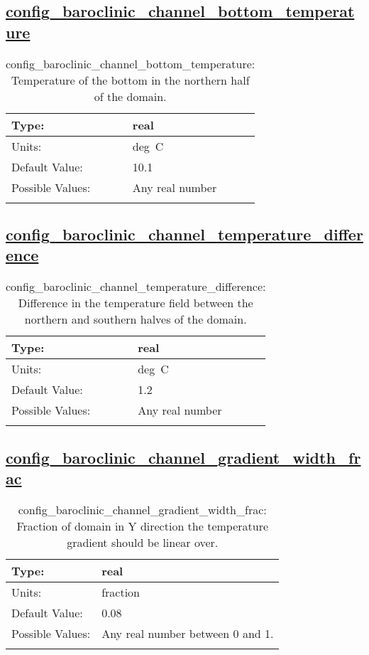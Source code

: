 \subsection[config\_baroclinic\_channel\_bottom\_temperature]{\hyperref[sec:nm_tab_baroclinic_channel]{config\_baroclinic\_channel\_bottom\_temperature}}
\label{subsec:nm_sec_config_baroclinic_channel_bottom_temperature}
\begin{center}
\begin{longtable}{| p{2.0in} || p{4.0in} |}
    \hline
    Type: & real \\
    \hline
    Units: & \si{deg.C} \\
    \hline
    Default Value: & 10.1 \\
    \hline
    Possible Values: & Any real number \\
    \hline
    \caption{config\_baroclinic\_channel\_bottom\_temperature: Temperature of the bottom in the northern half of the domain.}
\end{longtable}
\end{center}
\subsection[config\_baroclinic\_channel\_temperature\_difference]{\hyperref[sec:nm_tab_baroclinic_channel]{config\_baroclinic\_channel\_temperature\_difference}}
\label{subsec:nm_sec_config_baroclinic_channel_temperature_difference}
\begin{center}
\begin{longtable}{| p{2.0in} || p{4.0in} |}
    \hline
    Type: & real \\
    \hline
    Units: & \si{deg.C} \\
    \hline
    Default Value: & 1.2 \\
    \hline
    Possible Values: & Any real number \\
    \hline
    \caption{config\_baroclinic\_channel\_temperature\_difference: Difference in the temperature field between the northern and southern halves of the domain.}
\end{longtable}
\end{center}
\subsection[config\_baroclinic\_channel\_gradient\_width\_frac]{\hyperref[sec:nm_tab_baroclinic_channel]{config\_baroclinic\_channel\_gradient\_width\_frac}}
\label{subsec:nm_sec_config_baroclinic_channel_gradient_width_frac}
\begin{center}
\begin{longtable}{| p{2.0in} || p{4.0in} |}
    \hline
    Type: & real \\
    \hline
    Units: & \si{fraction} \\
    \hline
    Default Value: & 0.08 \\
    \hline
    Possible Values: & Any real number between 0 and 1. \\
    \hline
    \caption{config\_baroclinic\_channel\_gradient\_width\_frac: Fraction of domain in Y direction the temperature gradient should be linear over.}
\end{longtable}
\end{center}
